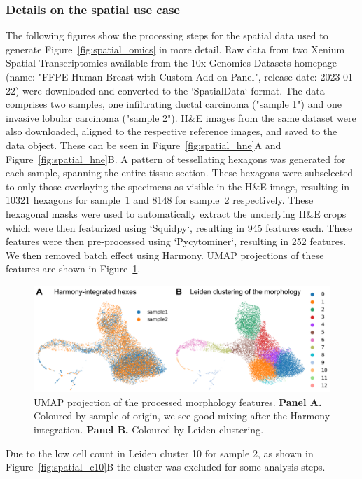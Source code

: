 \documentclass{article}
\begin{document}
\subsubsection{Details on the spatial use case}
\label{sec:spatial_extra}

The following figures show the processing steps for the spatial data used to generate Figure~\ref{fig:spatial_omics} in more detail. Raw data from two Xenium Spatial Transcriptomics available from the 10x Genomics Datasets homepage (name: "FFPE Human Breast with Custom Add-on Panel", release date: 2023-01-22) were downloaded and converted to the `SpatialData` format. The data comprises two samples, one infiltrating ductal carcinoma ("sample 1") and one invasive lobular carcinoma ("sample 2"). H\&E images from the same dataset were also downloaded, aligned to the respective reference images, and saved to the data object. These can be seen in Figure~\ref{fig:spatial_hne}A and Figure~\ref{fig:spatial_hne}B. A pattern of tessellating hexagons was generated for each sample, spanning the entire tissue section. These hexagons were subselected to only those overlaying the specimens as visible in the H\&E image, resulting in 10321 hexagons for sample~1 and 8148 for sample~2 respectively. These hexagonal masks were used to automatically extract the underlying H\&E crops which were then featurized using `Squidpy`, resulting in 945 features each. These features were then pre-processed using `Pycytominer`, resulting in 252 features. We then removed batch effect using Harmony. UMAP projections of these features are shown in Figure~\ref{fig:spatial_umap}.

\begin{figure}[htbp]
\centering
\includegraphics[width=.8\linewidth]{./figs/fig_S1_spatial_umap.png}
\caption{\label{fig:spatial_umap}{}UMAP projection of the processed morphology features. \textbf{Panel A.} Coloured by sample of origin, we see good mixing after the Harmony integration. \textbf{Panel B.} Coloured by Leiden clustering.}
\end{figure}

Due to the low cell count in Leiden cluster 10 for sample 2, as shown in Figure~\ref{fig:spatial_c10}B the cluster was excluded for some analysis steps.
\end{document}
